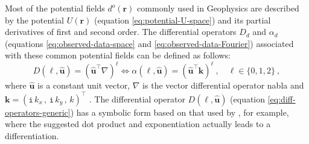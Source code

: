 Most of the potential fields $d^{o}(\mathbf{r})$ commonly used in Geophysics are described 
by the potential $U(\mathbf{r})$ (equation \ref{eq:potential-U-space}) and its partial derivatives of 
first and second order. 
The differential operators $D_{d}$ and $\alpha_{d}$ (equations \ref{eq:observed-data-space} 
and \ref{eq:observed-data-Fourier}) associated with these common potential fields can be defined as follows:
\begin{equation}
	D(\ell, \hat{\mathbf{u}}) = 
	\left( \hat{\mathbf{u}}^{\top} \nabla \right)^{\ell} \Leftrightarrow
	\alpha(\ell, \hat{\mathbf{u}}) = \left( \hat{\mathbf{u}}^{\top} \mathbf{k} \right)^{\ell} \: ,
	\quad \ell \in \{ 0, 1, 2 \} \: ,
	\label{eq:diff-operators-generic}
\end{equation}
where $\hat{\mathbf{u}}$ is a constant unit vector,
$\nabla$ is the vector differential operator nabla \citep[e.g.,][ p. 179]{kaplan2002} and 
$\mathbf{k} = ( \mathtt{i} \, k_{x} \, , \, \mathtt{i} \, k_{y} \, , \, k)^{\top}$
\citep{pedersen1978}.
The differential operator $D(\ell, \hat{\mathbf{u}})$ (equation \ref{eq:diff-operators-generic})
has a symbolic form based on that used by \citet[][ p. 179]{kaplan2002}, for example, where the suggested
dot product and exponentiation actually leads to a differentiation.

